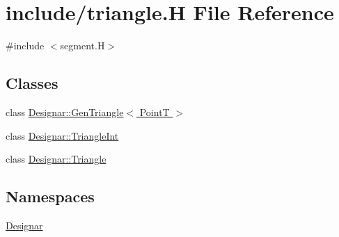 \hypertarget{triangle_8_h}{}\section{include/triangle.H File Reference}
\label{triangle_8_h}
{\ttfamily \#include $<$segment.\+H$>$}\newline
\subsection*{Classes}
\begin{DoxyCompactItemize}
\item 
class \hyperlink{class_designar_1_1_gen_triangle}{Designar\+::\+Gen\+Triangle$<$ Point\+T $>$}
\item 
class \hyperlink{class_designar_1_1_triangle_int}{Designar\+::\+Triangle\+Int}
\item 
class \hyperlink{class_designar_1_1_triangle}{Designar\+::\+Triangle}
\end{DoxyCompactItemize}
\subsection*{Namespaces}
\begin{DoxyCompactItemize}
\item 
 \hyperlink{namespace_designar}{Designar}
\end{DoxyCompactItemize}
